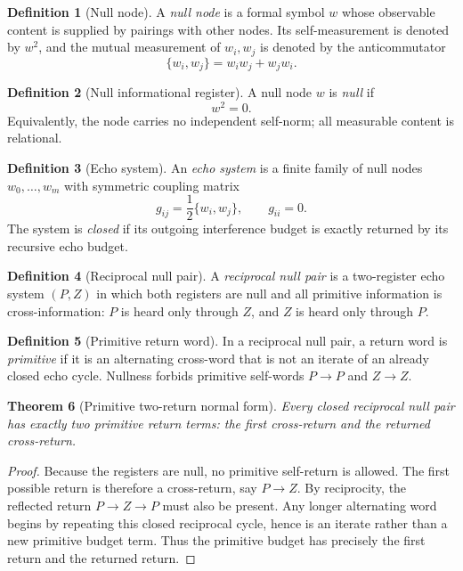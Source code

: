 \documentclass[11pt,a4paper]{article}
\theoremstyle{plain}
\newtheorem{theorem}{Theorem}[section]
\theoremstyle{definition}
\newtheorem{definition}[theorem]{Definition}
\theoremstyle{remark}
\numberwithin{equation}{section}
\begin{document}
\begin{definition}[Null node]
A \emph{null node} is a formal symbol \(w\) whose
observable content is supplied by pairings with other nodes.  Its
self-measurement is denoted by \(w^2\), and the mutual measurement of
\(w_i,w_j\) is denoted by the anticommutator
\[
  \{w_i,w_j\}=w_iw_j+w_jw_i .
\]
\end{definition}

\begin{definition}[Null informational register]
A null node \(w\) is \emph{null} if
\[
  w^2=0.
\]
Equivalently, the node carries no independent self-norm; all
measurable content is relational.
\end{definition}

\begin{definition}[Echo system]
An \emph{echo system} is a finite family of null nodes
\(w_0,\ldots,w_m\) with symmetric coupling matrix
\[
  g_{ij}=\frac12\{w_i,w_j\},\qquad g_{ii}=0.
\]
The system is \emph{closed} if its outgoing interference budget is
exactly returned by its recursive echo budget.
\end{definition}

\begin{definition}[Reciprocal null pair]
\label{def:reciprocal-null-pair}
A \emph{reciprocal null pair} is a two-register echo system
\((P,Z)\) in which both registers are null and all primitive information
is cross-information: \(P\) is heard only through \(Z\), and \(Z\) is
heard only through \(P\).
\end{definition}

\begin{definition}[Primitive return word]
\label{def:primitive-return-word}
In a reciprocal null pair, a return word is \emph{primitive} if it is an
alternating cross-word that is not an iterate of an already closed echo
cycle.  Nullness forbids primitive self-words \(P\to P\) and \(Z\to Z\).
\end{definition}

\begin{theorem}[Primitive two-return normal form]
\label{thm:two-return-normal-form}
Every closed reciprocal null pair has exactly two primitive return terms:
the first cross-return and the returned cross-return.
\end{theorem}

\begin{proof}
Because the registers are null, no primitive self-return is allowed.  The
first possible return is therefore a cross-return, say \(P\to Z\).  By
reciprocity, the reflected return \(P\to Z\to P\) must also be present.
Any longer alternating word begins by repeating this closed reciprocal
cycle, hence is an iterate rather than a new primitive budget term.
Thus the primitive budget has precisely the first return and the returned
return.
\end{proof}
\end{document}

